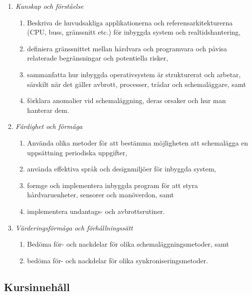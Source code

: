 \begin{enumerate}
\def\labelenumi{\Alph{enumi}.}
\tightlist
\item
  \emph{Kunskap och förståelse}

  \begin{enumerate}
  \def\labelenumii{\Alph{enumi}.\arabic{enumii}.}
  \tightlist
  \item
    Beskriva de huvudsakliga applikationerna och referensarkitekturerna
    (CPU, buss, gränssnitt etc.) för inbyggda system och
    realtidshantering,
  \item
    definiera gränssnittet mellan hårdvara och programvara och påvisa
    relaterade begränsningar och potentiella risker,
  \item
    sammanfatta hur inbyggda operativsystem är strukturerat och arbetar,
    särskilt när det gäller avbrott, processer, trådar och
    schemaläggare, samt
  \item
    förklara anomalier vid schemaläggning, deras orsaker och hur man
    hanterar dem.
  \end{enumerate}
\item
  \emph{Färdighet och förmåga}

  \begin{enumerate}
  \def\labelenumii{\Alph{enumi}.\arabic{enumii}.}
  \tightlist
  \item
    Använda olika metoder för att bestämma möjligheten att schemalägga
    en uppsättning periodiska uppgifter,
  \item
    använda effektiva språk och designmiljöer för inbyggda system,
  \item
    formge och implementera inbyggda program för att styra
    hårdvaruenheter, sensorer och manöverdon, samt
  \item
    implementera undantags- och avbrottsrutiner.
  \end{enumerate}
\item
  \emph{Värderingsförmåga och förhållningssätt}

  \begin{enumerate}
  \def\labelenumii{\Alph{enumi}.\arabic{enumii}.}
  \tightlist
  \item
    Bedöma för- och nackdelar för olika schemaläggningsmetoder, samt
  \item
    bedöma för- och nackdelar för olika synkroniseringsmetoder.
  \end{enumerate}
\end{enumerate}

\subsection*{Kursinnehåll}

